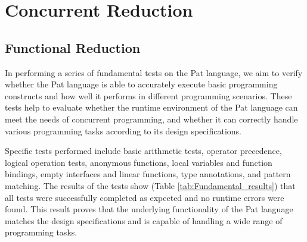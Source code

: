 \documentclass{l4proj}
\begin{document}
\section{Concurrent Reduction}

\subsection{Functional Reduction}
In performing a series of fundamental tests on the Pat language, we aim to verify whether the Pat language is able to accurately execute basic programming constructs and how well it performs in different programming scenarios. These tests help to evaluate whether the runtime environment of the Pat language can meet the needs of concurrent programming, and whether it can correctly handle various programming tasks according to its design specifications.

Specific tests performed include basic arithmetic tests, operator precedence, logical operation tests, anonymous functions, local variables and function bindings, empty interfaces and linear functions, type annotations, and pattern matching. The results of the tests show (Table \ref{tab:Fundamental_results}) that all tests were successfully completed as expected and no runtime errors were found. This result proves that the underlying functionality of the Pat language matches the design specifications and is capable of handling a wide range of programming tasks.

\begin{table}[ht]
\centering
\renewcommand{\arraystretch}{0.9}
\caption{Functional correct test results}
\label{tab:Fundamental_results}
\end{table}
\end{document}
